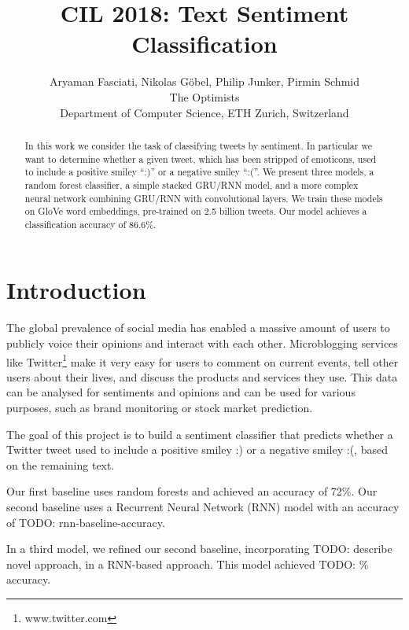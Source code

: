 \documentclass[10pt,conference,compsocconf]{IEEEtran}
\newcommand{\todo}[1]{}
\renewcommand{\todo}[1]{{\color{red} TODO: {#1}}}
\begin{document}
\title{CIL 2018: Text Sentiment Classification}

\author{
  Aryaman Fasciati, Nikolas G\"obel, Philip Junker, Pirmin Schmid\\
  The Optimists\\
  Department of Computer Science, ETH Zurich, Switzerland
}

\maketitle

\begin{abstract}
  In this work we consider the task of classifying tweets by
  sentiment. In particular we want to determine whether a given tweet,
  which has been stripped of emoticons, used to include a positive
  smiley ``:)'' or a negative smiley ``:(''. We present three models,
  a random forest classifier, a simple stacked GRU/RNN model, and a
  more complex neural network combining GRU/RNN with convolutional
  layers. We train these models on GloVe word embeddings, pre-trained
  on 2.5 billion tweets. Our model achieves a classification accuracy
  of 86.6\%.
\end{abstract}

\section{Introduction}

The global prevalence of social media has enabled a massive amount of users
to publicly voice their opinions and interact with each other.
Microblogging services like Twitter\footnote{www.twitter.com} make it
very easy for users to comment on current events, tell other users about their
lives, and discuss the products and services they use.
This data can be analysed for sentiments and opinions and can be used for
various purposes, such as brand monitoring or stock market prediction.

The goal of this project is to build a sentiment classifier that
predicts whether a Twitter tweet used to include a positive smiley :) or
a negative smiley :(, based on the remaining text.

Our first baseline uses random forests and achieved an accuracy of
72\%. Our second baseline uses a Recurrent Neural Network (RNN) model
with an accuracy of \todo{rnn-baseline-accuracy}.

In a third model, we refined our second baseline, incorporating
\todo{describe novel approach}, in a RNN-based approach. This model
achieved \todo{\%} accuracy.
\end{document}

